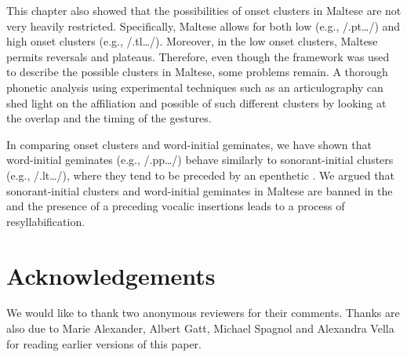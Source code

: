 \documentclass[output=paper]{langsci/langscibook}
\begin{document}
This chapter also showed that the possibilities of onset clusters in Maltese are not very heavily restricted. Specifically, Maltese allows for both low  (e.g., /.pt…/) and high  onset clusters (e.g., /.tl…/). Moreover, in the low  onset clusters, Maltese permits  reversals and  plateaus. Therefore, even though the  framework was used to describe the possible clusters in Maltese, some problems remain. A thorough phonetic analysis using experimental techniques such as an articulography can shed light on the  affiliation and possible  of such different clusters by looking at the  overlap and the timing of the gestures. 

In comparing onset clusters and word-initial geminates, we have shown that word-initial geminates (e.g., /.pp…/) behave similarly to sonorant-initial clusters (e.g., /.lt…/), where they tend to be preceded by an epenthetic . We argued that sonorant-initial clusters and word-initial geminates in Maltese are banned in the  and the presence of a preceding vocalic insertions leads to a process of resyllabification. 

\section*{Acknowledgements}
We would like to thank two anonymous reviewers for their comments. Thanks are also due to Marie Alexander, Albert Gatt, Michael Spagnol and Alexandra Vella for reading earlier versions of this paper.

\let\eachwordone=\itshape
\sloppy
\printbibliography[heading=subbibliography,notkeyword=this] 
\end{document}
